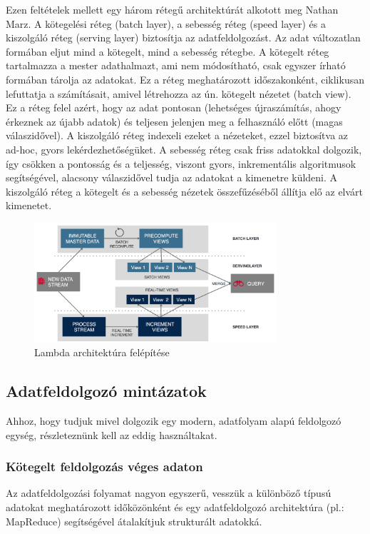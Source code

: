 \documentclass[a4paper,12pt]{article}
\begin{document}
Ezen feltételek mellett egy három rétegű architektúrát alkotott meg Nathan Marz\cite{lambda}. A kötegelési réteg (batch layer), a sebesség réteg (speed layer) és a kiszolgáló réteg (serving layer) biztosítja az adatfeldolgozást. Az adat változatlan formában eljut mind a kötegelt, mind a sebesség rétegbe. A kötegelt réteg tartalmazza a mester adathalmazt, ami nem módosítható, csak egyszer írható formában tárolja az adatokat. Ez a réteg meghatározott időszakonként, ciklikusan lefuttatja a számításait, amivel létrehozza az ún. kötegelt nézetet (batch view). Ez a réteg felel azért, hogy az adat pontosan (lehetséges újraszámítás, ahogy érkeznek az újabb adatok) és teljesen jelenjen meg a felhasználó előtt (magas válaszidővel).  A kiszolgáló réteg indexeli ezeket a nézeteket, ezzel biztosítva az ad-hoc, gyors lekérdezhetőségüket. \newline
A sebesség réteg csak friss adatokkal dolgozik, így csökken a pontosság és a teljesség, viszont gyors, inkrementális algoritmusok segítségével, alacsony válaszidővel tudja az adatokat a kimenetre küldeni. A kiszolgáló réteg a kötegelt és a sebesség nézetek összefűzéséből állítja elő az elvárt kimenetet.

\begin{figure}[ht!]
\centering
\includegraphics[width=90mm]{img/lambda.png}
\caption{Lambda architektúra felépítése \label{lambda}}
\end{figure}


\subsection{Adatfeldolgozó mintázatok}
Ahhoz, hogy tudjuk mivel dolgozik egy modern, adatfolyam alapú feldolgozó egység, részleteznünk kell az eddig használtakat\cite{tyler}.

\subsubsection{Kötegelt feldolgozás véges adaton}
Az adatfeldolgozási folyamat nagyon egyszerű, vesszük a különböző típusú adatokat meghatározott időközönként és egy adatfeldolgozó architektúra (pl.: MapReduce\cite{mapreduce}) segítségével átalakítjuk strukturált adatokká.
\end{document}
